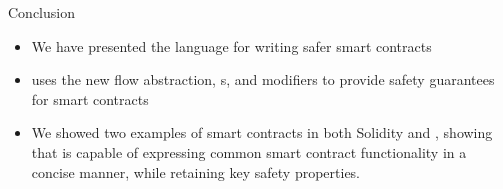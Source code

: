 \documentclass[leqno,presentation,usenames,dvipsnames]{beamer}
\begin{document}
\begin{frame}{Conclusion}
    \begin{itemize}
        \item We have presented the \langName language for writing safer smart contracts
        \item \langName uses the new flow abstraction, \assetTxt{}s, and modifiers to provide safety guarantees for smart contracts
        \item We showed two examples of smart contracts in both Solidity and \langName, showing that \langName is capable of expressing common smart contract functionality in a concise manner, while retaining key safety properties.
    \end{itemize}
\end{frame}
\end{document}
